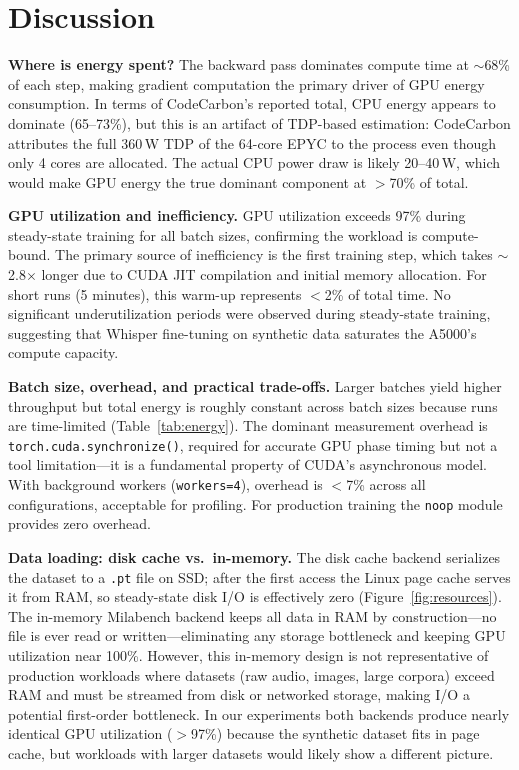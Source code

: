 \documentclass[10pt,twocolumn]{article}
\begin{document}
\section{Discussion}

\textbf{Where is energy spent?}
The backward pass dominates compute time at $\sim$68\% of each step, making gradient computation the primary driver of GPU energy consumption. In terms of CodeCarbon's reported total, CPU energy appears to dominate (65--73\%), but this is an artifact of TDP-based estimation: CodeCarbon attributes the full 360\,W TDP of the 64-core EPYC to the process even though only 4 cores are allocated. The actual CPU power draw is likely 20--40\,W, which would make GPU energy the true dominant component at $>$70\% of total.

\textbf{GPU utilization and inefficiency.}
GPU utilization exceeds 97\% during steady-state training for all batch sizes, confirming the workload is compute-bound. The primary source of inefficiency is the first training step, which takes $\sim$2.8$\times$ longer due to CUDA JIT compilation and initial memory allocation. For short runs (5 minutes), this warm-up represents $<$2\% of total time. No significant underutilization periods were observed during steady-state training, suggesting that Whisper fine-tuning on synthetic data saturates the A5000's compute capacity.

\textbf{Batch size, overhead, and practical trade-offs.}
Larger batches yield higher throughput but total energy is roughly constant across batch sizes because runs are time-limited (Table~\ref{tab:energy}). The dominant measurement overhead is \texttt{torch.cuda.synchronize()}, required for accurate GPU phase timing but not a tool limitation---it is a fundamental property of CUDA's asynchronous model. With background workers (\texttt{workers=4}), overhead is $<$7\% across all configurations, acceptable for profiling. For production training the \texttt{noop} module provides zero overhead.

\textbf{Data loading: disk cache vs.\ in-memory.}
The disk cache backend serializes the dataset to a \texttt{.pt} file on SSD; after the first access the Linux page cache serves it from RAM, so steady-state disk I/O is effectively zero (Figure~\ref{fig:resources}). The in-memory Milabench backend keeps all data in RAM by construction---no file is ever read or written---eliminating any storage bottleneck and keeping GPU utilization near 100\%. However, this in-memory design is not representative of production workloads where datasets (raw audio, images, large corpora) exceed RAM and must be streamed from disk or networked storage, making I/O a potential first-order bottleneck. In our experiments both backends produce nearly identical GPU utilization ($>$97\%) because the synthetic dataset fits in page cache, but workloads with larger datasets would likely show a different picture.
\end{document}
